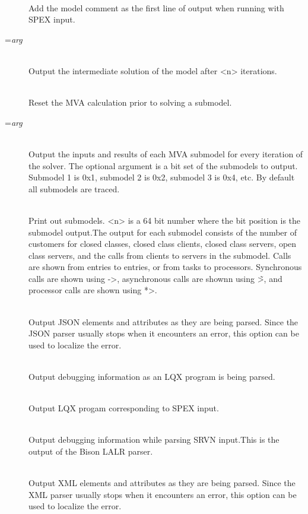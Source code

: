 \begin{description}
\item[]~\\
Add the model comment as the first line of output when running with SPEX input.
\item[=\emph{arg}]~\\
Output the intermediate solution of the model after <n> iterations.
\item[]~\\
Reset the MVA calculation prior to solving a submodel.
\item[=\emph{arg}]~\\
Output the inputs and results of each MVA submodel for every iteration of the solver.
The optional argument is a bit set of the submodels to output.  Submodel 1 is 0x1, 
submodel 2 is 0x2, submodel 3 is 0x4, etc.  By default all submodels are traced.
\item[]~\\
Print out submodels. <n> is a 64 bit number where the bit position is the submodel output.The output for each submodel consists of the number of customers for closed classes, closed class clients, 
closed class servers, open class servers, and the calls from clients to servers in the submodel.
Calls are shown from entries to entries, or from tasks to processors.
Synchronous calls are shown using ->, 
asynchronous calls are shownn using \~>, and 
processor calls are shown using *>.
\item[]~\\
Output JSON elements and attributes as they are being parsed.   Since the JSON parser usually stops when it encounters an error,
this option can be used to localize the error.
\item[]~\\
Output debugging information as an LQX program is being parsed.
\item[]~\\
Output LQX progam corresponding to SPEX input.
\item[]~\\
Output debugging information while parsing SRVN input.This is the output of the Bison LALR parser.
\item[]~\\
Output XML elements and attributes as they are being parsed.
Since the XML parser usually stops when it encounters an error,
this option can be used to localize the error.
\end{description}


